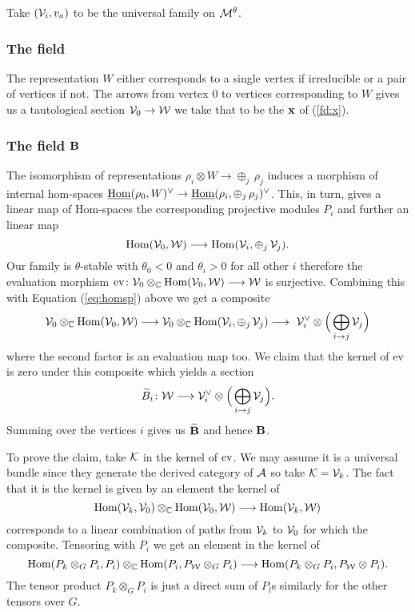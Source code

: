 \documentclass{amsart}
\theoremstyle{definition}
\begin{document}
Take $(\mathcal{V}_i, v_a)$ to be the universal family on $\mathcal{M}^\theta$.

\subsubsection{The field \bfx}

The representation $W$ either corresponds to a single vertex if irreducible or a pair of vertices if not.
The arrows from vertex $0$ to vertices corresponding to $W$ gives us a tautological section $\mathcal{V}_0 \rightarrow \mathcal{W}$ we take that to be the $\mathbf{x}$ of (\ref{fd:x}).

\subsubsection{The field $\mathbf{B}$}
The isomorphism of representations $\rho_i \otimes W \rightarrow \oplus_j\, \rho_j$ induces a morphism of internal hom-spaces $\underline{\operatorname{Hom}}(\rho_0, W)^\vee \rightarrow \underline{\operatorname{Hom}}(\rho_i, \oplus_j \, \rho_j)^\vee$.
This, in turn, gives a linear map of Hom-spaces the corresponding projective modules $P_i$ and further an linear map
\begin{equation}\label{eq:homsp}
    {\operatorname{Hom}}(\mathcal{V}_0, \mathcal{W}) \longrightarrow {\operatorname{Hom}}(\mathcal{V}_i, \oplus_j \, \mathcal{V}_j).
\end{equation}
Our family is $\theta$-stable with $\theta_0<0$ and $\theta_i>0$ for all other $i$ therefore the evaluation morphism $\text{ev} \colon \mathcal{V}_0 \otimes_{\mathbb{C}} {\operatorname{Hom}}(\mathcal{V}_0, \mathcal{W}) \longrightarrow \mathcal{W}$ is surjective.
Combining this with Equation (\ref{eq:homsp}) above we get a composite
$$\mathcal{V}_0 \otimes_{\mathbb{C}} {\operatorname{Hom}}(\mathcal{V}_0, \mathcal{W}) \longrightarrow \mathcal{V}_0 \otimes_{\mathbb{C}} {\operatorname{Hom}}(\mathcal{V}_i, \oplus_j \, \mathcal{V}_j) \longrightarrow\ \mathcal{V}_i^\vee \otimes \Big(\bigoplus_{i \rightarrow j}\mathcal{V}_j\Big)$$
where the second factor is an evaluation map too.
We claim that the kernel of ev is zero under this composite which yields a section 
$$\widetilde{B}_i \colon \mathcal{W} \longrightarrow \mathcal{V}_i^\vee \otimes \Big(\bigoplus_{i \rightarrow j}\mathcal{V}_j\Big).$$
Summing over the vertices $i$ gives us $\widetilde{\mathbf{B}}$ and hence $\mathbf{B}$.

To prove the claim, take $\mathcal{K}$ in the kernel of $\operatorname{ev}$.
We may assume it is a universal bundle since they generate the derived category of $\mathcal{A}$ so take $\mathcal{K}=\mathcal{V}_k$.
The fact that it is the kernel is given by an element the kernel of 
\begin{equation}
    \operatorname{Hom}(\mathcal{V}_k, \mathcal{V}_0) \otimes_{\mathbb{C}} \operatorname{Hom}(\mathcal{V}_0, \mathcal{W}) \longrightarrow \operatorname{Hom}(\mathcal{V}_k, \mathcal{W})
\end{equation}
corresponds to a linear combination of paths from $\mathcal{V}_k$ to $\mathcal{V}_0$ for which the composite.
Tensoring with $P_i$ we get an element in the kernel of 
\begin{equation}
    \operatorname{Hom}(P_k \otimes_G P_i, P_i) \otimes_{\mathbb{C}} \operatorname{Hom}(P_i, P_{\mathcal{W}} \otimes_G P_i) \longrightarrow \operatorname{Hom}(P_k \otimes_G P_i, P_{\mathcal{W}} \otimes P_i).
\end{equation}
The tensor product $P_k \otimes_G P_i$ is just a direct sum of $P_l$s similarly for the other tensors over $G$.
\end{document}
